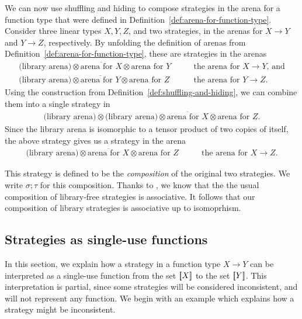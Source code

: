 \documentclass[10pt,a4paper]{amsart}
\numberwithin{equation}{section}
\theoremstyle{plain}
\newcommand{\sem}[1]{[{\kern-0.45ex}[#1]{\kern-0.45ex}]}
\begin{document}
We can now use shuffling and hiding to compose strategies in the arena for a function type that were defined in Definition~\ref{def:arena-for-function-type}.
Consider three linear types $X, Y, Z$, and two strategies, in the arenas for $X \to Y$ and $Y \to Z$, respectively.
 By unfolding the definition of arenas from Definition~\ref{def:arena-for-function-type}, these are strategies in the arenas 
\begin{align*}
\text{(library arena)} \otimes \overline{\text{arena for $X$}} \otimes \text{arena for $Y$} & \qquad \text{the arena for $X \to Y$, and}
\\
\text{(library arena)} \otimes \overline{\text{arena for $Y$}} \otimes \text{arena for $Z$} & \qquad \text{the arena for $Y \to Z$}.
\end{align*}
Using the construction from Definition~\ref{def:shuffling-and-hiding}, we can combine them into a single  strategy in 
\begin{align*}
\text{(library arena)} \otimes  \text{(library arena)}\otimes \overline{\text{arena for $X$}} \otimes \text{arena for $Z$}.
\end{align*}
Since the library arena is isomorphic to a tensor product of two copies of itself, the above strategy gives us a strategy in the arena 
\begin{align*}
    \text{(library arena)} \otimes   \overline{\text{arena for $X$}} \otimes \text{arena for $Z$} & \qquad \text{the arena for $X \to Z$.}
    \end{align*}

This strategy is defined to be the \emph{composition} of the original two  strategies. We write $\sigma; \tau$ for this composition. Thanks to \cite[Proposition~1.2]{abramsky2013semantics}, we know that the the usual
composition of library-free strategies is associative. It follows that our composition of library strategies is associative 
up to isomoprhism. 


\subsection{Strategies as single-use functions}
In this section, we explain how a strategy in a function type $X \to Y$ can be interpreted as a single-use function from the set  $\sem X$ to the set $\sem Y$. This interpretation is partial, since some strategies will be considered inconsistent, and will not represent any function. We begin with an example which explains how  a strategy might be inconsistent. 
\end{document}

